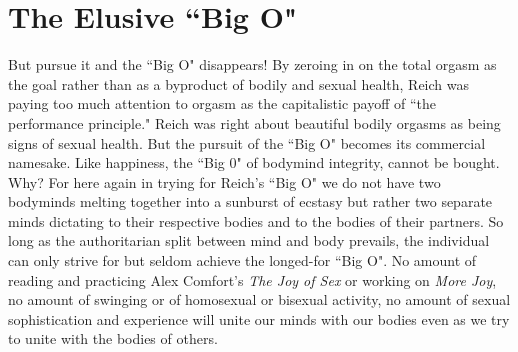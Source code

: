 \section*{The Elusive ``Big O"}
But pursue it and the ``Big O" disappears! By zeroing in on the total orgasm as the goal rather than as a byproduct of bodily and sexual health, Reich was paying too much attention to orgasm as the capitalistic payoff of ``the performance principle." Reich was right about beautiful bodily orgasms as being signs of sexual health. But the pursuit of the ``Big O" becomes its commercial namesake. Like happiness, the ``Big 0" of bodymind integrity, cannot be bought.\\
Why? For here again in trying for Reich's ``Big O"  we do not have two bodyminds melting together into a sunburst of ecstasy but rather two separate minds dictating to their respective bodies and to the bodies of their partners. So long as the authoritarian split between mind and body prevails, the individual can only strive for but seldom achieve the longed-for ``Big O". No amount of reading and practicing Alex Comfort's \emph{The Joy of Sex} or working on \emph{More Joy}, no amount of swinging or of homosexual or bisexual activity, no amount of sexual sophistication and experience will unite our minds with our bodies even as we try to unite with the bodies of others.


